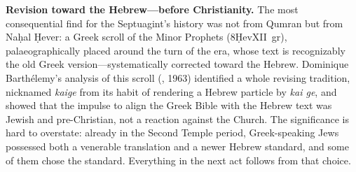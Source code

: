 \textbf{Revision toward the Hebrew---before Christianity.} The most
consequential find for the Septuagint's history was not from Qumran but
from Na\d{h}al \d{H}ever: a Greek scroll of the Minor Prophets
(8\d{H}evXII~gr), palaeographically placed around the turn of the era, whose
text is recognizably the old Greek version---systematically corrected
toward the Hebrew. Dominique Barth\'elemy's analysis of this scroll
(, 1963) identified a whole revising
tradition, nicknamed \textit{kaige} from its habit of rendering a Hebrew
particle by \textit{kai ge}, and showed that the impulse to align the Greek
Bible with the Hebrew text was Jewish and pre-Christian, not a reaction
against the Church. The significance is hard to overstate: already in the
Second Temple period, Greek-speaking Jews possessed both a venerable
translation and a newer Hebrew standard, and some of them chose the
standard. Everything in the next act follows from that choice.
